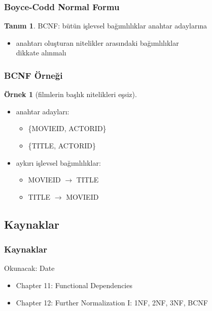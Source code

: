 \documentclass[dvipsnames]{beamer}
\theoremstyle{definition}
\newtheorem{tanim}[theorem]{Tanım}
\theoremstyle{example}
\newtheorem{ornek}[theorem]{Örnek}
\theoremstyle{plain}
\begin{document}
\begin{frame}
  \frametitle{Boyce-Codd Normal Formu}

  \begin{tanim}
    \alert{BCNF}: bütün işlevsel bağımlılıklar anahtar adaylarına
  \end{tanim}

  \pause
  \begin{itemize}
    \item anahtarı oluşturan nitelikler arasındaki bağımlılıklar\\
      dikkate alınmalı
  \end{itemize}
\end{frame}

\begin{frame}
  \frametitle{BCNF Örneği}

  \begin{ornek}[filmlerin başlık nitelikleri eşsiz]
    \begin{itemize}
      \item anahtar adayları:
      \begin{itemize}
        \item \{MOVIEID, ACTORID\}
        \item \{TITLE, ACTORID\}
      \end{itemize}

      \pause
      \item aykırı işlevsel bağımlılıklar:
      \begin{itemize}
        \item MOVIEID $\rightarrow$ TITLE
        \item TITLE $\rightarrow$ MOVIEID
      \end{itemize}
    \end{itemize}
  \end{ornek}
\end{frame}

\subsection*{Kaynaklar}

\begin{frame}
  \frametitle{Kaynaklar}

  \begin{block}{Okunacak: Date}
    \begin{itemize}
      \item Chapter 11: \alert{Functional Dependencies}
      \item Chapter 12: \alert{Further Normalization I: 1NF, 2NF, 3NF, BCNF}
    \end{itemize}
  \end{block}
\end{frame}
\end{document}
